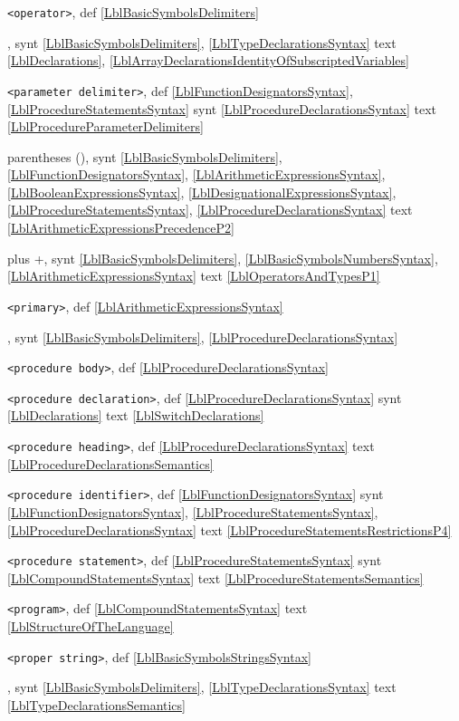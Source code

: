 \documentclass[a4paper,11pt]{article}
\begin{document}
\texttt{<operator>},
def
\ref{LblBasicSymbolsDelimiters}\*

,
synt
\ref{LblBasicSymbolsDelimiters},
\ref{LblTypeDeclarationsSyntax}
text
\ref{LblDeclarations},
\ref{LblArrayDeclarationsIdentityOfSubscriptedVariables}\*

\texttt{<parameter delimiter>},
def
\ref{LblFunctionDesignatorsSyntax},
\ref{LblProcedureStatementsSyntax}
synt
\ref{LblProcedureDeclarationsSyntax}
text
\ref{LblProcedureParameterDelimiters}\*

parentheses (),
synt
\ref{LblBasicSymbolsDelimiters},
\ref{LblFunctionDesignatorsSyntax},
\ref{LblArithmeticExpressionsSyntax},
\ref{LblBooleanExpressionsSyntax},
\ref{LblDesignationalExpressionsSyntax},
\ref{LblProcedureStatementsSyntax},
\ref{LblProcedureDeclarationsSyntax}
text
\ref{LblArithmeticExpressionsPrecedenceP2}\*

plus +,
synt
\ref{LblBasicSymbolsDelimiters},
\ref{LblBasicSymbolsNumbersSyntax},
\ref{LblArithmeticExpressionsSyntax}
text
\ref{LblOperatorsAndTypesP1}\*

\texttt{<primary>},
def
\ref{LblArithmeticExpressionsSyntax}\*

,
synt
\ref{LblBasicSymbolsDelimiters},
\ref{LblProcedureDeclarationsSyntax}\*

\texttt{<procedure body>},
def
\ref{LblProcedureDeclarationsSyntax}\*

\texttt{<procedure declaration>},
def
\ref{LblProcedureDeclarationsSyntax}
synt
\ref{LblDeclarations}
text
\ref{LblSwitchDeclarations}\*

\texttt{<procedure heading>},
def
\ref{LblProcedureDeclarationsSyntax}
text
\ref{LblProcedureDeclarationsSemantics}\*

\texttt{<procedure identifier>},
def
\ref{LblFunctionDesignatorsSyntax}
synt
\ref{LblFunctionDesignatorsSyntax},
\ref{LblProcedureStatementsSyntax},
\ref{LblProcedureDeclarationsSyntax}
text
\ref{LblProcedureStatementsRestrictionsP4}\*

\texttt{<procedure statement>},
def
\ref{LblProcedureStatementsSyntax}
synt
\ref{LblCompoundStatementsSyntax}
text
\ref{LblProcedureStatementsSemantics}\*

\texttt{<program>},
def
\ref{LblCompoundStatementsSyntax}
text
\ref{LblStructureOfTheLanguage}\*

\texttt{<proper string>},
def
\ref{LblBasicSymbolsStringsSyntax}\*

,
synt
\ref{LblBasicSymbolsDelimiters},
\ref{LblTypeDeclarationsSyntax}
text
\ref{LblTypeDeclarationsSemantics}\*
\end{document}
